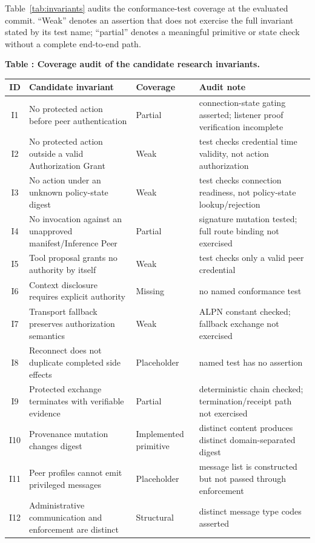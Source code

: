 \documentclass[10pt]{article}
\begin{document}
\noindent Table~\ref{tab:invariants} audits the conformance-test coverage at the evaluated commit. ``Weak'' denotes an assertion that does not exercise the full invariant stated by its test name; ``partial'' denotes a meaningful primitive or state check without a complete end-to-end path.

\begin{center}
\small
{}
\label{tab:invariants}
\textbf{Table \thetable: Coverage audit of the candidate research invariants.}\\[4pt]
\begin{tabularx}{\textwidth}{@{}c Y l Y@{}}
\toprule
ID & Candidate invariant & Coverage & Audit note \\
\midrule
I1 & No protected action before peer authentication & Partial & connection-state gating asserted; listener proof verification incomplete \\
I2 & No protected action outside a valid Authorization Grant & Weak & test checks credential time validity, not action authorization \\
I3 & No action under an unknown policy-state digest & Weak & test checks connection readiness, not policy-state lookup/rejection \\
I4 & No invocation against an unapproved manifest/Inference Peer & Partial & signature mutation tested; full route binding not exercised \\
I5 & Tool proposal grants no authority by itself & Weak & test checks only a valid peer credential \\
I6 & Context disclosure requires explicit authority & Missing & no named conformance test \\
I7 & Transport fallback preserves authorization semantics & Weak & ALPN constant checked; fallback exchange not exercised \\
I8 & Reconnect does not duplicate completed side effects & Placeholder & named test has no assertion \\
I9 & Protected exchange terminates with verifiable evidence & Partial & deterministic chain checked; termination/receipt path not exercised \\
I10 & Provenance mutation changes digest & Implemented primitive & distinct content produces distinct domain-separated digest \\
I11 & Peer profiles cannot emit privileged messages & Placeholder & message list is constructed but not passed through enforcement \\
I12 & Administrative communication and enforcement are distinct & Structural & distinct message type codes asserted \\
\bottomrule
\end{tabularx}
\end{center}
\end{document}
